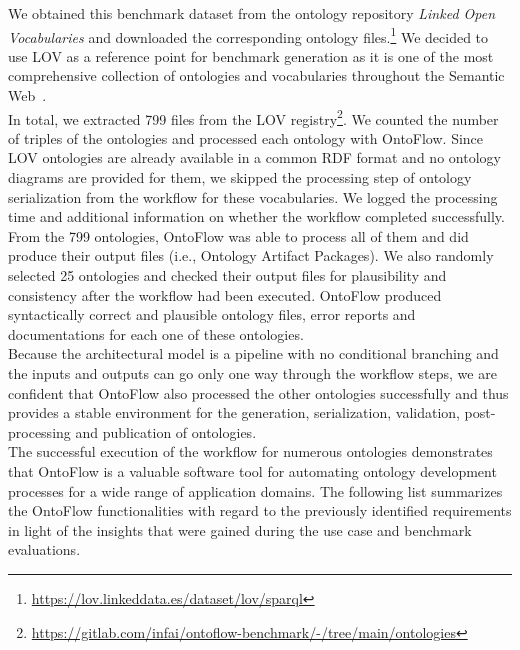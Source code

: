 \documentclass[runningheads]{llncs}
\begin{document}
We obtained this benchmark dataset from the ontology repository \textit{Linked Open Vocabularies} and downloaded the corresponding ontology files.\footnote{\url{https://lov.linkeddata.es/dataset/lov/sparql}} We decided to use LOV as a reference point for benchmark generation as it is one of the most comprehensive collection of ontologies and vocabularies throughout the Semantic Web~\cite{lov}.\\ In total, we extracted 799 files from the LOV registry\footnote{\url{https://gitlab.com/infai/ontoflow-benchmark/-/tree/main/ontologies}}. We counted the number of triples of the ontologies and processed each ontology with OntoFlow. Since LOV ontologies are already available in a common RDF format and no ontology diagrams are provided for them, we skipped the processing step of ontology serialization from the workflow for these vocabularies. We logged the processing time and additional information on whether the workflow completed successfully. From the 799 ontologies, OntoFlow was able to process all of them and did produce their output files (i.e., Ontology Artifact Packages). We also randomly selected 25 ontologies and checked their output files for plausibility and consistency after the workflow had been executed. OntoFlow produced syntactically correct and plausible ontology files, error reports and documentations for each one of these ontologies.\\ Because the architectural model is a pipeline with no conditional branching and the inputs and outputs can go only one way through the workflow steps, we are confident that OntoFlow also processed the other ontologies successfully and thus provides a stable environment for the generation, serialization, validation, post-processing and publication of ontologies.\\
The successful execution of the workflow for numerous ontologies demonstrates that OntoFlow is a valuable software tool for automating ontology development processes for a wide range of application domains. The following list summarizes the OntoFlow functionalities with regard to the previously identified requirements in light of the insights that were gained during the use case and benchmark evaluations.
\end{document}
